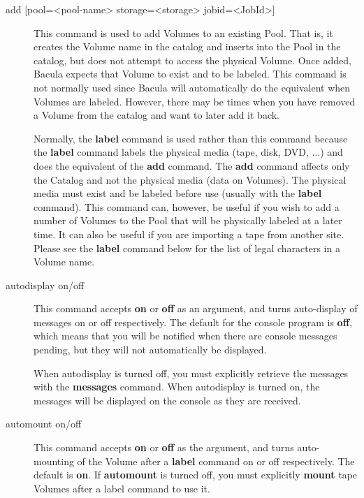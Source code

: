 \begin{description}
\item [{add [pool={\textless}pool-name{\textgreater} storage={\textless}storage{\textgreater}
   jobid={\textless}JobId{\textgreater}]} ]
   This command is used to add Volumes to an existing Pool.  That is,
   it creates the Volume name in the catalog and inserts into the Pool
   in the catalog, but does not attempt to access the physical Volume.
   Once
   added, Bacula expects that Volume to exist and to be labeled.
   This command is not normally used since Bacula will
   automatically do the equivalent when Volumes are labeled. However,
   there may be times when you have removed a Volume from the catalog
   and want to later add it back.

   Normally, the {\bf label} command is used rather than this command
   because the {\bf label} command labels the physical media (tape, disk,
   DVD, ...) and does the equivalent of the {\bf add} command.  The {\bf
   add} command affects only the Catalog and not the physical media (data
   on Volumes).  The physical media must exist and be labeled before use
   (usually with the {\bf label} command).  This command can, however, be
   useful if you wish to add a number of Volumes to the Pool that will be
   physically labeled at a later time.  It can also be useful if you are
   importing a tape from another site.  Please see the {\bf label} command
   below for the list of legal characters in a Volume name.

\item [autodisplay on/off]
   This command accepts {\bf on} or {\bf off} as an argument, and turns
   auto-display of messages on or off respectively.  The default for the
   console program is {\bf off}, which means that you will be notified when
   there are console messages pending, but they will not automatically be
   displayed.

   When autodisplay is turned off, you must explicitly retrieve the
   messages with the {\bf messages} command.  When autodisplay is turned
   on, the messages will be displayed on the console as they are received.

\item [automount on/off]
   This command accepts {\bf on} or {\bf off} as the argument, and turns
   auto-mounting of the Volume after a {\bf label} command on or off
   respectively.  The default is {\bf on}.  If {\bf automount} is turned
   off, you must explicitly {\bf mount} tape Volumes after a label command to
   use it.


\end{description}
